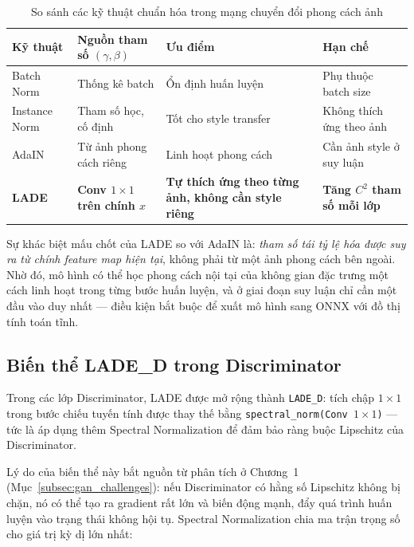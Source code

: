 \begin{table}[H]
\caption{So sánh các kỹ thuật chuẩn hóa trong mạng chuyển đổi phong cách ảnh}
\label{tab:norm_comparison}
\centering
\begin{tabular}{|p{2.6cm}|p{3.4cm}|p{3.4cm}|p{3.4cm}|}
\hline
\textbf{Kỹ thuật} & \textbf{Nguồn tham số $(\gamma,\beta)$} & \textbf{Ưu điểm} & \textbf{Hạn chế} \\
\hline
Batch Norm \cite{Ioffe2015} & Thống kê batch & Ổn định huấn luyện & Phụ thuộc batch size \\
\hline
Instance Norm \cite{Ulyanov2016} & Tham số học, cố định & Tốt cho style transfer & Không thích ứng theo ảnh \\
\hline
AdaIN & Từ ảnh phong cách riêng & Linh hoạt phong cách & Cần ảnh style ở suy luận \\
\hline
\textbf{LADE} \cite{Liu2024} & \textbf{Conv $1\times 1$ trên chính $x$} & \textbf{Tự thích ứng theo từng ảnh, không cần style riêng} & \textbf{Tăng $C^2$ tham số mỗi lớp} \\
\hline
\end{tabular}
\end{table}

Sự khác biệt mấu chốt của LADE so với AdaIN là: \textit{tham số tái tỷ lệ hóa được suy ra từ chính feature map hiện tại}, không phải từ một ảnh phong cách bên ngoài. Nhờ đó, mô hình có thể học phong cách nội tại của không gian đặc trưng một cách linh hoạt trong từng bước huấn luyện, và ở giai đoạn suy luận chỉ cần một đầu vào duy nhất --- điều kiện bắt buộc để xuất mô hình sang ONNX với đồ thị tính toán tĩnh.

\subsection{Biến thể LADE\_D trong Discriminator}
\label{subsec:lade_d}

Trong các lớp Discriminator, LADE được mở rộng thành \texttt{LADE\_D}: tích chập $1 \times 1$ trong bước chiếu tuyến tính được thay thế bằng \texttt{spectral\_norm(Conv $1\times1$)} --- tức là áp dụng thêm Spectral Normalization \cite{Miyato2018} để đảm bảo ràng buộc Lipschitz của Discriminator.

Lý do của biến thể này bắt nguồn từ phân tích ở Chương~1 (Mục~\ref{subsec:gan_challenges}): nếu Discriminator có hằng số Lipschitz không bị chặn, nó có thể tạo ra gradient rất lớn và biến động mạnh, đẩy quá trình huấn luyện vào trạng thái không hội tụ. Spectral Normalization chia ma trận trọng số cho giá trị kỳ dị lớn nhất:

